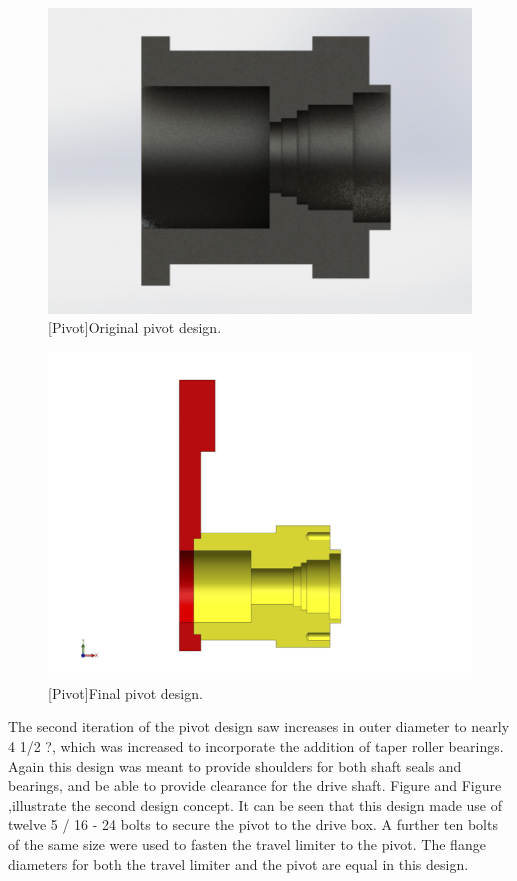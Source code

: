 \begin{figure}[htbp]
\centering
\includegraphics[height=0.3\textheight]{./images/oldpivothaft}
[Pivot]{Original pivot design.}
\label{fig:pivotold}
\end{figure}
\newpage
\begin{figure}[htbp]
\centering
\includegraphics[height=0.3\textheight]{./images/finalpivot}
[Pivot]{Final pivot design.}
\label{fig:pivotfinal}
\end{figure}
The second iteration of the pivot design saw increases in outer diameter to nearly 4 1/2 ?, which was increased to incorporate the addition of taper roller bearings. Again this design was meant to provide shoulders for both shaft seals and bearings, and be able to provide clearance for the drive shaft. Figure and Figure ,illustrate the second design concept. It can be seen that this design made use of twelve 5 / 16 - 24 bolts to secure the pivot to the drive box. A further ten bolts of the same size were used to fasten the travel limiter to the pivot. The flange diameters for both the travel limiter and the pivot are equal in this design.


